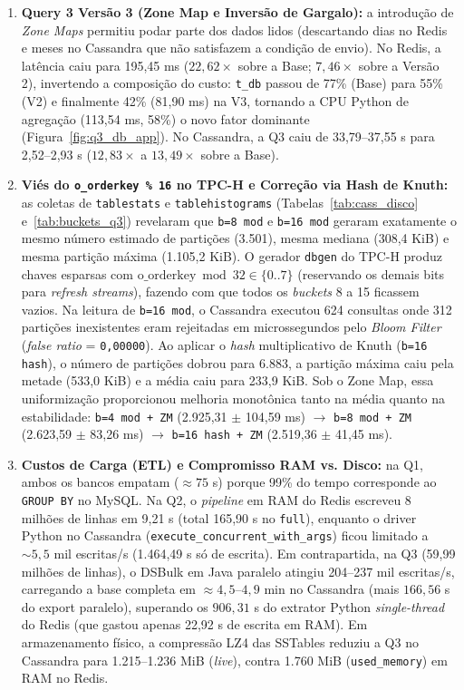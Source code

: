\documentclass[12pt,a4paper]{article}
\begin{document}
\begin{enumerate}
    \item \textbf{Query 3 Versão 3 (Zone Map e Inversão de Gargalo):} a introdução de \textit{Zone Maps} permitiu podar parte dos dados lidos (descartando dias no Redis e meses no Cassandra que não satisfazem a condição de envio). No Redis, a latência caiu para 195,45 ms ($22{,}62\times$ sobre a Base; $7{,}46\times$ sobre a Versão 2), invertendo a composição do custo: \texttt{t\_db} passou de 77\% (Base) para 55\% (V2) e finalmente 42\% (81,90 ms) na V3, tornando a CPU Python de agregação (113,54 ms, 58\%) o novo fator dominante (Figura~\ref{fig:q3_db_app}). No Cassandra, a Q3 caiu de 33,79--37,55 s para 2,52--2,93 s ($12{,}83\times$ a $13{,}49\times$ sobre a Base).

    \item \textbf{Viés do \texttt{o\_orderkey \% 16} no TPC-H e Correção via Hash de Knuth:} as coletas de \texttt{tablestats} e \texttt{tablehistograms} (Tabelas~\ref{tab:cass_disco} e~\ref{tab:buckets_q3}) revelaram que \texttt{b=8 mod} e \texttt{b=16 mod} geraram exatamente o mesmo número estimado de partições (3.501), mesma mediana (308,4 KiB) e mesma partição máxima (1.105,2 KiB). O gerador \texttt{dbgen} do TPC-H produz chaves esparsas com $\text{o\_orderkey} \bmod 32 \in \{0..7\}$ (reservando os demais bits para \textit{refresh streams}), fazendo com que todos os \textit{buckets} 8 a 15 ficassem vazios. Na leitura de \texttt{b=16 mod}, o Cassandra executou 624 consultas onde 312 partições inexistentes eram rejeitadas em microssegundos pelo \textit{Bloom Filter} (\textit{false ratio} = \texttt{0,00000}). Ao aplicar o \textit{hash} multiplicativo de Knuth (\texttt{b=16 hash}), o número de partições dobrou para 6.883, a partição máxima caiu pela metade (533,0 KiB) e a média caiu para 233,9 KiB. Sob o Zone Map, essa uniformização proporcionou melhoria monotônica tanto na média quanto na estabilidade: \texttt{b=4 mod + ZM} (2.925,31 $\pm$ 104,59 ms) $\rightarrow$ \texttt{b=8 mod + ZM} (2.623,59 $\pm$ 83,26 ms) $\rightarrow$ \texttt{b=16 hash + ZM} (2.519,36 $\pm$ 41,45 ms).

    \item \textbf{Custos de Carga (ETL) e Compromisso RAM vs. Disco:} na Q1, ambos os bancos empatam ($\approx 75$ s) porque 99\% do tempo corresponde ao \texttt{GROUP BY} no MySQL. Na Q2, o \textit{pipeline} em RAM do Redis escreveu 8 milhões de linhas em 9,21 s (total 165,90 s no \texttt{full}), enquanto o driver Python no Cassandra (\texttt{execute\_concurrent\_with\_args}) ficou limitado a $\sim 5{,}5$ mil escritas/s (1.464,49 s só de escrita). Em contrapartida, na Q3 (59,99 milhões de linhas), o DSBulk em Java paralelo atingiu 204--237 mil escritas/s, carregando a base completa em $\approx 4{,}5$--$4{,}9$ min no Cassandra (mais $166{,}56$ s do export paralelo), superando os $906{,}31$ s do extrator Python \textit{single-thread} do Redis (que gastou apenas 22,92 s de escrita em RAM). Em armazenamento físico, a compressão LZ4 das SSTables reduziu a Q3 no Cassandra para 1.215--1.236 MiB (\textit{live}), contra 1.760 MiB (\texttt{used\_memory}) em RAM no Redis.
\end{enumerate}
\end{document}
